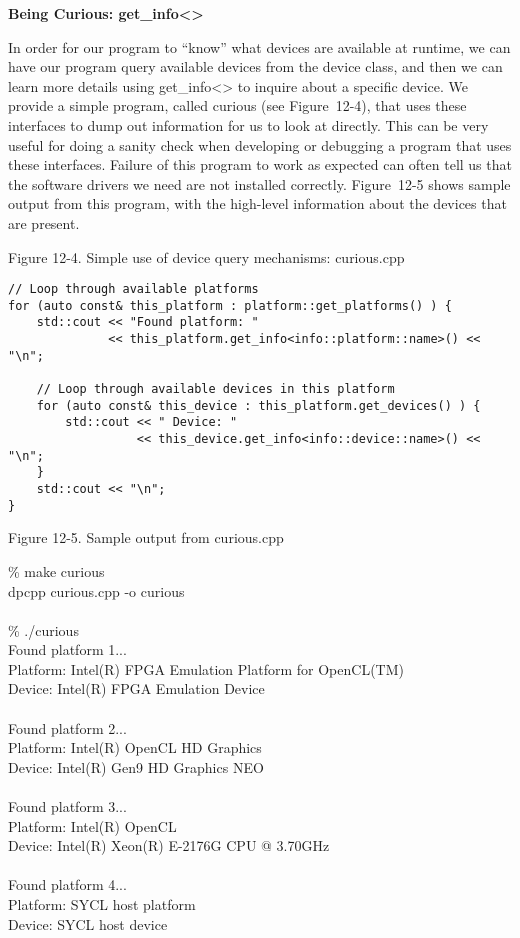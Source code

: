 \hspace*{\fill} \par %
\textbf{Being Curious: get\_info<>}

In order for our program to “know” what devices are available at runtime, we can have our program query available devices from the device class, and then we can learn more details using get\_info<> to inquire about a specific device. We provide a simple program, called curious (see Figure 12-4), that uses these interfaces to dump out information for us to look at directly. This can be very useful for doing a sanity check when developing or debugging a program that uses these interfaces. Failure of this program to work as expected can often tell us that the software drivers we need are not installed correctly. Figure 12-5 shows sample output from this program, with the high-level information about the devices that are present.\par

\hspace*{\fill} \par %
Figure 12-4. Simple use of device query mechanisms: curious.cpp
\begin{lstlisting}[caption={}]
// Loop through available platforms
for (auto const& this_platform : platform::get_platforms() ) {
	std::cout << "Found platform: "
			  << this_platform.get_info<info::platform::name>() << "\n";
	
	// Loop through available devices in this platform
	for (auto const& this_device : this_platform.get_devices() ) {
		std::cout << " Device: "
				  << this_device.get_info<info::device::name>() << "\n";
	}
	std::cout << "\n";
}
\end{lstlisting}

\hspace*{\fill} \par %
Figure 12-5. Sample output from curious.cpp
\begin{tcolorbox}[colback=white,colframe=black]
\% make curious \\
dpcpp curious.cpp -o curious\\
\\
\% ./curious \\
Found platform 1...\\
Platform: Intel(R) FPGA Emulation Platform for OpenCL(TM)\\
Device: Intel(R) FPGA Emulation Device\\
\\
Found platform 2...\\
Platform: Intel(R) OpenCL HD Graphics\\
Device: Intel(R) Gen9 HD Graphics NEO\\
\\
Found platform 3...\\
Platform: Intel(R) OpenCL\\
Device: Intel(R) Xeon(R) E-2176G CPU @ 3.70GHz\\
\\
Found platform 4...\\
Platform: SYCL host platform\\
Device: SYCL host device
\end{tcolorbox}

